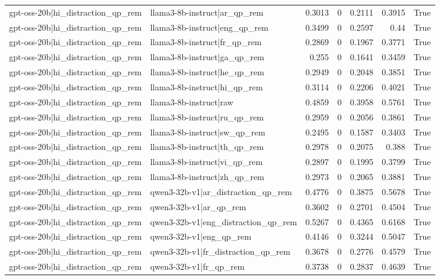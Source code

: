 \begin{table}
\begin{tabular}{l l r r r r l}
gpt-oss-20b|hi_distraction_qp_rem & llama3-8b-instruct|ar_qp_rem & 0.3013 & 0 & 0.2111 & 0.3915 & True \\
gpt-oss-20b|hi_distraction_qp_rem & llama3-8b-instruct|eng_qp_rem & 0.3499 & 0 & 0.2597 & 0.44 & True \\
gpt-oss-20b|hi_distraction_qp_rem & llama3-8b-instruct|fr_qp_rem & 0.2869 & 0 & 0.1967 & 0.3771 & True \\
gpt-oss-20b|hi_distraction_qp_rem & llama3-8b-instruct|ga_qp_rem & 0.255 & 0 & 0.1641 & 0.3459 & True \\
gpt-oss-20b|hi_distraction_qp_rem & llama3-8b-instruct|he_qp_rem & 0.2949 & 0 & 0.2048 & 0.3851 & True \\
gpt-oss-20b|hi_distraction_qp_rem & llama3-8b-instruct|hi_qp_rem & 0.3114 & 0 & 0.2206 & 0.4021 & True \\
gpt-oss-20b|hi_distraction_qp_rem & llama3-8b-instruct|raw & 0.4859 & 0 & 0.3958 & 0.5761 & True \\
gpt-oss-20b|hi_distraction_qp_rem & llama3-8b-instruct|ru_qp_rem & 0.2959 & 0 & 0.2056 & 0.3861 & True \\
gpt-oss-20b|hi_distraction_qp_rem & llama3-8b-instruct|sw_qp_rem & 0.2495 & 0 & 0.1587 & 0.3403 & True \\
gpt-oss-20b|hi_distraction_qp_rem & llama3-8b-instruct|th_qp_rem & 0.2978 & 0 & 0.2075 & 0.388 & True \\
gpt-oss-20b|hi_distraction_qp_rem & llama3-8b-instruct|vi_qp_rem & 0.2897 & 0 & 0.1995 & 0.3799 & True \\
gpt-oss-20b|hi_distraction_qp_rem & llama3-8b-instruct|zh_qp_rem & 0.2973 & 0 & 0.2065 & 0.3881 & True \\
gpt-oss-20b|hi_distraction_qp_rem & qwen3-32b-v1|ar_distraction_qp_rem & 0.4776 & 0 & 0.3875 & 0.5678 & True \\
gpt-oss-20b|hi_distraction_qp_rem & qwen3-32b-v1|ar_qp_rem & 0.3602 & 0 & 0.2701 & 0.4504 & True \\
gpt-oss-20b|hi_distraction_qp_rem & qwen3-32b-v1|eng_distraction_qp_rem & 0.5267 & 0 & 0.4365 & 0.6168 & True \\
gpt-oss-20b|hi_distraction_qp_rem & qwen3-32b-v1|eng_qp_rem & 0.4146 & 0 & 0.3244 & 0.5047 & True \\
gpt-oss-20b|hi_distraction_qp_rem & qwen3-32b-v1|fr_distraction_qp_rem & 0.3678 & 0 & 0.2776 & 0.4579 & True \\
gpt-oss-20b|hi_distraction_qp_rem & qwen3-32b-v1|fr_qp_rem & 0.3738 & 0 & 0.2837 & 0.4639 & True \\

\end{tabular}
\end{table}
